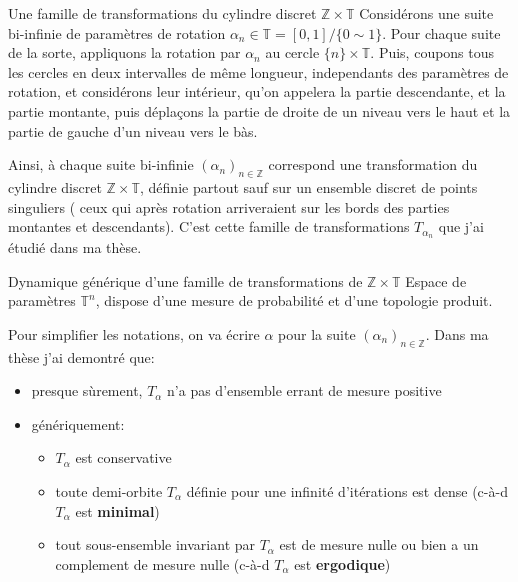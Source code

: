 \documentclass[professionalfont, 12pt, dvipdfmx, default, cjk]{beamer}
\providecommand{\tightlist}{%
    \setlength{\itemsep}{0pt}\setlength{\parskip}{0pt}}
\begin{document}
\begin{frame}{Une famille de transformations du cylindre discret
\(ℤ×𝕋\)}
\protect\hypertarget{une-famille-de-transformations-du-cylindre-discret-ux2124ux1d54b}{}
Considérons une suite bi-infinie de paramètres de rotation
\(α_n∈𝕋 = [0,1]/\{0\sim 1\}\). Pour chaque suite de la sorte, appliquons
la rotation par \(α_n\) au cercle \(\{n\}×𝕋\). Puis, coupons tous les
cercles en deux intervalles de même longueur, independants des
paramètres de rotation, et considérons leur intérieur, qu'on appelera la
partie descendante, et la partie montante, puis déplaçons la partie de
droite de un niveau vers le haut et la partie de gauche d'un niveau vers
le bàs.

Ainsi, à chaque suite bi-infinie \((α_n)_{n∈ℤ}\) correspond une
transformation du cylindre discret \(ℤ×𝕋\), définie partout sauf sur un
ensemble discret de points singuliers ( ceux qui après rotation
arriveraient sur les bords des parties montantes et descendants). C'est
cette famille de transformations \(T_{α_n}\) que j'ai étudié dans ma
thèse.
\end{frame}

\begin{frame}{Dynamique générique d'une famille de transformations de
\(ℤ×𝕋\)}
\protect\hypertarget{dynamique-guxe9nuxe9rique-dune-famille-de-transformations-de-ux2124ux1d54b}{}
Espace de paramètres \(𝕋^n\), dispose d'une mesure de probabilité et
d'une topologie produit.

Pour simplifier les notations, on va écrire \(α\) pour la suite
\((α_n)_{n\in ℤ}\). Dans ma thèse j'ai demontré que:

\begin{itemize}
\item
  presque sùrement, \(T_α\) n'a pas d'ensemble errant de mesure positive
\item
  génériquement:

  \begin{itemize}
  \tightlist
  \item
    \(T_α\) est conservative
  \item
    toute demi-orbite \(T_α\) définie pour une infinité d'itérations est
    dense (c-à-d \(T_α\) est \textbf{minimal})
  \item
    tout sous-ensemble invariant par \(T_α\) est de mesure nulle ou bien
    a un complement de mesure nulle (c-à-d \(T_α\) est
    \textbf{ergodique})
  \end{itemize}
\end{itemize}
\end{frame}
\end{document}
